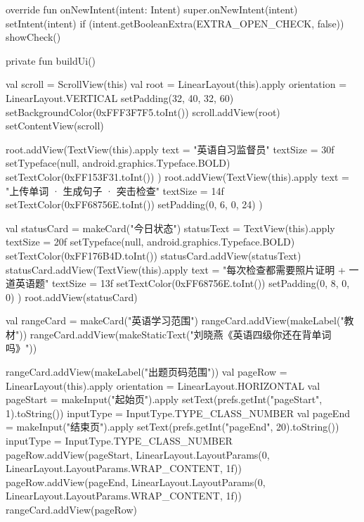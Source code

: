 {    override fun onNewIntent(intent: Intent) {
        super.onNewIntent(intent)
        setIntent(intent)
        if (intent.getBooleanExtra(EXTRA_OPEN_CHECK, false)) showCheck()
    }

    private fun buildUi() {
        val scroll = ScrollView(this)
        val root = LinearLayout(this).apply {
            orientation = LinearLayout.VERTICAL
            setPadding(32, 40, 32, 60)
            setBackgroundColor(0xFFF3F7F5.toInt())
        }
        scroll.addView(root)
        setContentView(scroll)

        root.addView(TextView(this).apply {
            text = "英语自习监督员"
            textSize = 30f
            setTypeface(null, android.graphics.Typeface.BOLD)
            setTextColor(0xFF153F31.toInt())
        })
        root.addView(TextView(this).apply {
            text = "上传单词 · 生成句子 · 突击检查"
            textSize = 14f
            setTextColor(0xFF68756E.toInt())
            setPadding(0, 6, 0, 24)
        })

        val statusCard = makeCard("今日状态")
        statusText = TextView(this).apply {
            textSize = 20f
            setTypeface(null, android.graphics.Typeface.BOLD)
            setTextColor(0xFF176B4D.toInt())
        }
        statusCard.addView(statusText)
        statusCard.addView(TextView(this).apply {
            text = "每次检查都需要照片证明 + 一道英语题"
            textSize = 13f
            setTextColor(0xFF68756E.toInt())
            setPadding(0, 8, 0, 0)
        })
        root.addView(statusCard)

        val rangeCard = makeCard("英语学习范围")
        rangeCard.addView(makeLabel("教材"))
        rangeCard.addView(makeStaticText("刘晓燕《英语四级你还在背单词吗》"))

        rangeCard.addView(makeLabel("出题页码范围"))
        val pageRow = LinearLayout(this).apply { orientation = LinearLayout.HORIZONTAL }
        val pageStart = makeInput("起始页").apply {
            setText(prefs.getInt("pageStart", 1).toString())
            inputType = InputType.TYPE_CLASS_NUMBER
        }
        val pageEnd = makeInput("结束页").apply {
            setText(prefs.getInt("pageEnd", 20).toString())
            inputType = InputType.TYPE_CLASS_NUMBER
        }
        pageRow.addView(pageStart, LinearLayout.LayoutParams(0, LinearLayout.LayoutParams.WRAP_CONTENT, 1f))
        pageRow.addView(pageEnd, LinearLayout.LayoutParams(0, LinearLayout.LayoutParams.WRAP_CONTENT, 1f))
        rangeCard.addView(pageRow)

}}
